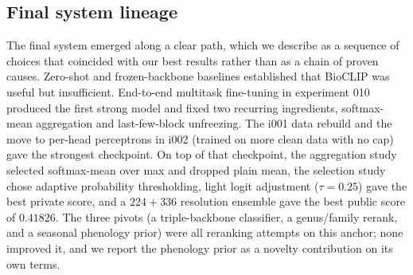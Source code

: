 \subsection{Final system lineage}
The final system emerged along a clear path, which we describe as a sequence of choices
that coincided with our best results rather than as a chain of proven causes. Zero-shot
and frozen-backbone baselines established that BioCLIP was useful but insufficient.
End-to-end multitask fine-tuning in experiment 010 produced the first strong model and
fixed two recurring ingredients, softmax-mean aggregation and last-few-block
unfreezing. The i001 data rebuild and the move to per-head perceptrons in i002 (trained
on more clean data with no cap) gave the strongest checkpoint. On top of that
checkpoint, the aggregation study selected softmax-mean over max and dropped plain mean,
the selection study chose adaptive probability thresholding, light logit adjustment
($\tau{=}0.25$) gave the best private score, and a $224{+}336$ resolution ensemble gave
the best public score of $0.41826$. The three pivots (a triple-backbone classifier, a
genus/family rerank, and a seasonal phenology prior) were all reranking attempts on this
anchor; none improved it, and we report the phenology prior as a novelty contribution
on its own terms.

